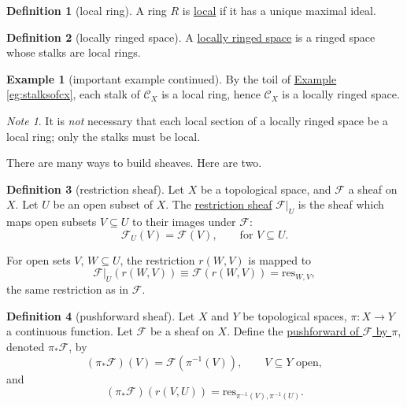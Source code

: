 \documentclass[a4paper,10pt]{scrreprt}
\newcommand{\defn}[1]{\ul{#1}}
\theoremstyle{definition}
\newtheorem{definition}{Definition}[section]
\newtheorem{example}{Example}[section]
\theoremstyle{plain}
\theoremstyle{remark}
\newtheorem{note}{Note}[section]
\begin{document}
\begin{definition}[local ring]
  \label{def:local ring} 
  A ring $R$ is \defn{local} if it has a unique maximal ideal.
\end{definition}

\begin{definition}[locally ringed space]
  A \defn{locally ringed space} is a ringed space whose stalks are local rings.
\end{definition}

\begin{example}[important example continued]
  By the toil of \hyperref[eg:stalksofcx]{Example \ref*{eg:stalksofcx}}, each stalk of $\mathcal{C}_{X}$ is a local ring, hence $\mathcal{C}_{X}$ is a locally ringed space.
\end{example}

\begin{note}
  It is \emph{not} necessary that each local section of a locally ringed space be a local ring; only the stalks must be local.
\end{note}

There are many ways to build sheaves. Here are two.

\begin{definition}[restriction sheaf]
  \label{def:restrictionsheaf}
  Let $X$ be a topological space, and $\mathcal{F}$ a sheaf on $X$. Let $U$ be an open subset of $X$. The \defn{restriction sheaf} $\mathcal{F}|_{U}$ is the sheaf which maps open subsets $V\subseteq U$ to their images under $\mathcal{F}$:
  \begin{equation*}
    \mathcal{F}_{U}(V) = \mathcal{F}(V),\qquad\text{for }V \subseteq U.
  \end{equation*}

  For open sets $V$, $W \subseteq U$, the restriction $r(W,V)$ is mapped to 
  \begin{equation*}
    \mathcal{F}|_{U}(r(W,V)) \equiv \mathcal{F}(r(W,V)) = \mathrm{res}_{W,V},
  \end{equation*}
  the same restriction as in $\mathcal{F}$.
\end{definition}

\begin{definition}[pushforward sheaf]
  \label{def:pushforwardsheaf}
  Let $X$ and $Y$ be topological spaces, $\pi\colon X \to Y$ a continuous function. Let $\mathcal{F}$ be a sheaf on $X$. Define the \defn{pushforward of $\mathcal{F}$ by $\pi$}, denoted $\pi_{*}\mathcal{F}$, by
  \begin{equation*}
    (\pi_{*}\mathcal{F})(V) = \mathcal{F}(\pi^{-1}(V)),\qquad V\subseteq Y\text{ open},
  \end{equation*}
  and
  \begin{equation*}
    (\pi_{*}\mathcal{F})(r(V,U)) = \mathrm{res}_{\pi^{-1}(V), \pi^{-1}(U)}.
  \end{equation*}
\end{definition}
\end{document}
